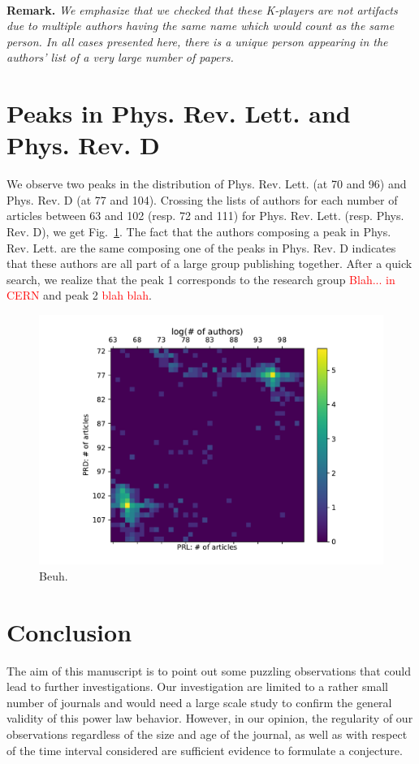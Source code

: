 \documentclass[aps,prl,floatfix,twocolumn]{revtex4-1}
\begin{document}
\paragraph{}
{\bf Remark.}\textit{
We emphasize that we checked that these K-players are not artifacts due to multiple authors having the same name which would count as the same person. 
In all cases presented here, there is a unique person appearing in the authors' list of a very large number of papers. 
}

\section{Peaks in Phys. Rev. Lett. and Phys. Rev. D}
We observe two peaks in the distribution of Phys. Rev. Lett. (at 70 and 96) and Phys. Rev. D (at 77 and 104). 
Crossing the lists of authors for each number of articles between 63 and 102 (resp. 72 and 111) for Phys. Rev. Lett. (resp. Phys. Rev. D), we get Fig.~\ref{fig:prl_prd}. 
The fact that the authors composing a peak in Phys. Rev. Lett. are the same composing one of the peaks in Phys. Rev. D indicates that these authors are all part of a large group publishing together. 
After a quick search, we realize that the peak 1 corresponds to the research group \textcolor{red}{Blah... in CERN} and peak 2 \textcolor{red}{blah blah}.
\begin{figure}
 \centering
 \includegraphics[width=.8\columnwidth]{figures/prl_prd_log.pdf}
 \caption{Beuh.}
 \label{fig:prl_prd}
\end{figure}


\section{Conclusion}
The aim of this manuscript is to point out some puzzling observations that could lead to further investigations. 
Our investigation are limited to a rather small number of journals and would need a large scale study to confirm the general validity of this power law behavior. 
However, in our opinion, the regularity of our observations regardless of the size and age of the journal, 
as well as with respect of the time interval considered are sufficient evidence to formulate a conjecture. 




\end{document}
